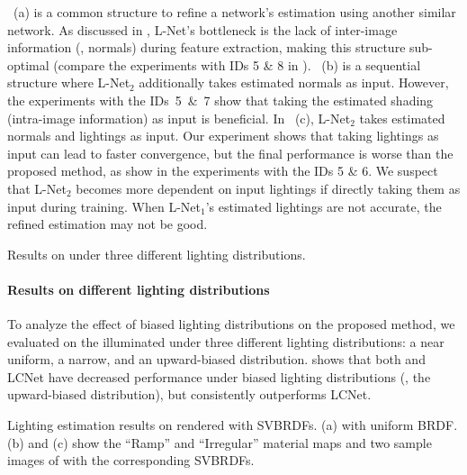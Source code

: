~(a) is a common structure to refine a network's estimation using another similar network. As discussed in , L-Net's bottleneck is the lack of inter-image information (\eg, normals) during feature extraction, making this structure sub-optimal (compare the experiments with IDs 5 \& 8 in ).
~(b) is a sequential structure where L-Net$_2$ additionally takes estimated normals as input. However, the experiments with the IDs~5~\&~7 show that taking the estimated shading (intra-image information) as input is beneficial.
In ~(c), L-Net$_2$ takes estimated normals and lightings as input.
Our experiment shows that taking lightings as input can lead to faster convergence, but the final performance is worse than the proposed method, as show in the experiments with the IDs 5 \& 6.
We suspect that L-Net$_2$ becomes more dependent on input lightings if directly taking them as input during training.
When \mbox{L-Net$_1$'s} estimated lightings are not accurate, the refined estimation may not be good. 

\begin{table}[tbp] \centering
    \caption[Results on  under three different lighting distributions]{Results on  under three different lighting distributions.}
    
    \label{tab:synth_biased_light}
\end{table}

\paragraph{Results on different lighting distributions}
To analyze the effect of biased lighting distributions on the proposed method, we evaluated \gcnetacronym on the  illuminated under three different lighting distributions: a near uniform, a narrow, and an upward-biased distribution. 
 shows that both \gcnetacronym and LCNet have decreased performance under biased lighting distributions (\eg, the upward-biased distribution), but \gcnetacronym consistently outperforms LCNet.

\begin{table}[htbp]
    \caption[Lighting estimation results on  rendered with SVBRDFs]{Lighting estimation results on  rendered with SVBRDFs. (a)  with uniform BRDF. (b) and (c) show the ``Ramp'' and ``Irregular'' material maps and two sample images of  with the corresponding SVBRDFs.}
    
    \label{tab:synth_SVBRDFs}
\end{table}

